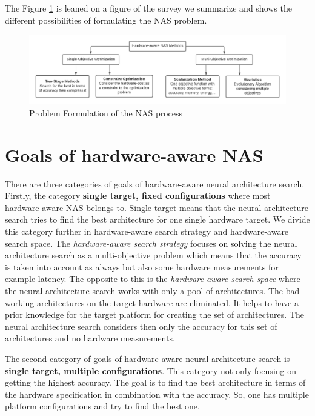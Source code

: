 \documentclass[conference]{IEEEtran}
\begin{document}
The Figure \ref{fig:ProblemFormulation} is leaned on a figure of the survey \cite{bib1} we summarize and shows the different possibilities of formulating the NAS problem.

\begin{figure}[htbp]
\includegraphics[width=\textwidth]{ProblemFormulation.png}
\caption{Problem Formulation of the NAS process \cite{bib1}}
\label{fig:ProblemFormulation}
\end{figure} 

\section{Goals of hardware-aware NAS}
\label{section:Goals}
There are three categories of goals of hardware-aware neural architecture search. Firstly, the category \textbf{single target, fixed configurations} where most hardware-aware NAS belongs to. Single target means that the neural architecture search tries to find the best architecture for one single hardware target. We divide this category further in hardware-aware search strategy and hardware-aware search space. The \textit{hardware-aware search strategy} focuses on solving the neural architecture search as a multi-objective problem which means that the accuracy is taken into account as always but also some hardware measurements for example latency. The opposite to this is the \textit{hardware-aware search space} where the neural architecture search works with only a pool of architectures. The bad working architectures on the target hardware are eliminated. It helps to have a prior knowledge for the target platform for creating the set of architectures. The neural architecture search considers then only the accuracy for this set of architectures and no hardware measurements.

The second category of goals of hardware-aware neural architecture search is \textbf{single target, multiple configurations}. This category not only focusing on getting the highest accuracy. The goal is to find the best architecture in terms of the hardware specification in combination with the accuracy. So, one has multiple platform configurations and try to find the best one. 
\end{document}

